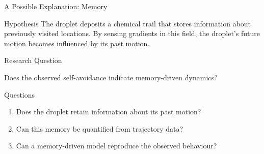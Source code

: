\begin{frame}{A Possible Explanation: Memory}

	\centering


	\vspace{0.5cm}

	\begin{alertblock}{Hypothesis}
		The droplet deposits a chemical trail that stores information about previously visited locations. By sensing gradients in this field, the droplet's future motion becomes influenced by its past motion.
	\end{alertblock}

\end{frame}

\begin{frame}{Research Question}

	\begin{center}

		\Large
		Does the observed self-avoidance indicate memory-driven dynamics?

	\end{center}

	\vspace{0.5cm}

	\begin{block}{Questions}
		\begin{enumerate}
			\item Does the droplet retain information about its past motion?
			\item Can this memory be quantified from trajectory data?
			\item Can a memory-driven model reproduce the observed behaviour?
		\end{enumerate}
	\end{block}

\end{frame}

